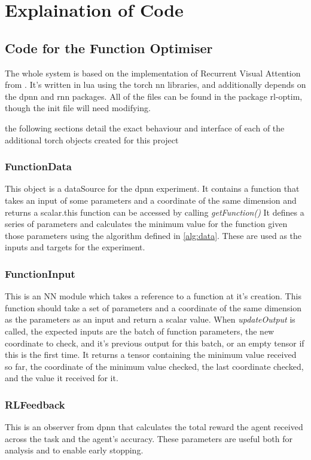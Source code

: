 \section{Explaination of Code}

\subsection{Code for the Function Optimiser}
The whole system is based on the implementation of Recurrent Visual Attention from \cite{Torch:RVA}. It's written in lua using the torch nn libraries, and additionally depends on the dpnn and rnn packages. All of the files can be found in the package rl-optim, though the init file will need modifying.

the following sections detail the exact behaviour and interface of each of the additional torch objects created for this project
\subsubsection{FunctionData}
This object is a dataSource for the dpnn experiment. It contains a function that takes an input of some parameters and a coordinate of the same dimension and returns a scalar.this function can be accessed by calling \emph{getFunction()} It defines a series of parameters and calculates the minimum value for the function given those parameters using the algorithm defined in \ref{alg:data}. These are used as the inputs and targets for the experiment.

\subsubsection{FunctionInput}
This is an NN module which takes a reference to a function at it's creation. This function should take a set of parameters and a coordinate of the same dimension as the parameters as an input and return a scalar value. When \emph{updateOutput} is called, the expected inputs are the batch of function parameters, the new coordinate to check, and it's previous output for this batch, or an empty tensor if this is the first time. It returns a tensor containing the minimum value received so far, the coordinate of the minimum value checked, the last coordinate checked, and the value it received for it. 
\subsubsection{RLFeedback}
This is an observer from dpnn that calculates the total reward the agent received across the task and the agent's accuracy. These parameters are useful both for analysis and to enable early stopping.
